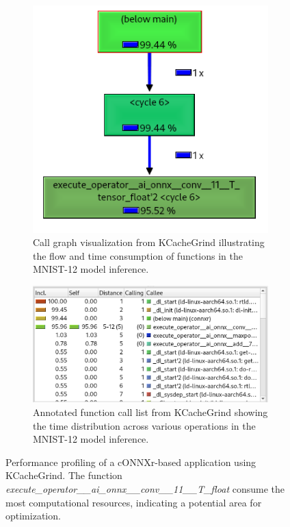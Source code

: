 \documentclass[fleqn,10pt]{olplainarticle}
\begin{document}
\begin{figure}[!ht]
    \centering
    \begin{subfigure}[b]{0.4\textwidth}
        \centering
        \includegraphics[width=\textwidth]{Images/connxr.png}
        \caption{Call graph visualization from KCacheGrind illustrating the flow and time consumption of functions in the MNIST-12 model inference.}
        \label{fig:connxr_tree}
    \end{subfigure}
    \hfill
    \begin{subfigure}[b]{0.45\textwidth}
        \centering
        \includegraphics[width=\textwidth]{Images/connxr_ir.png}
        \caption{Annotated function call list from KCacheGrind showing the time distribution across various operations in the MNIST-12 model inference.}
        \label{fig:connxr_ir}
    \end{subfigure}
    \caption{Performance profiling of a cONNXr-based application using KCacheGrind. The function \textit{execute\_operator\_\_ai\_onnx\_\_conv\_\_11\_\_T\_float} consume the most computational resources, indicating a potential area for optimization.}
    \label{fig:connxr}
\end{figure}
\end{document}
